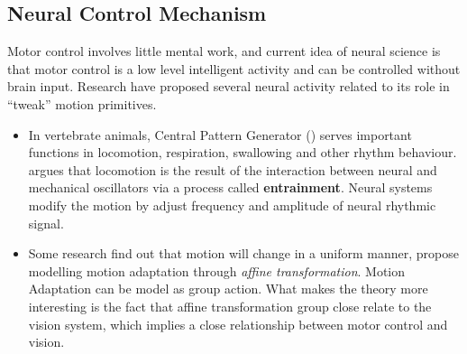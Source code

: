 \subsection{ Neural Control Mechanism}
Motor control involves little mental work,
and current idea of neural science is that motor control is a low level intelligent activity and can be controlled  without brain input. 
Research have proposed several neural activity related to its role in ``tweak''  motion primitives.
\begin{itemize}
\item
In vertebrate animals,  Central Pattern Generator (\cpg) serves important functions in locomotion, respiration, swallowing and other rhythm behaviour.
\citet{Cohen1988a} argues that locomotion is the result of the interaction between neural and mechanical oscillators via a process called \textbf{entrainment}.
Neural systems modify the motion by adjust frequency and amplitude of neural rhythmic signal.



\item
Some research find out that motion will change in a uniform manner\citep{Viviani1992},\citep{flash2007affine} propose modelling motion adaptation through \emph{affine transformation}.
Motion Adaptation can be model as group action.
What makes the theory more interesting is the fact that affine transformation group close relate to the vision system, which implies a close relationship between motor control and vision.

\end{itemize}









